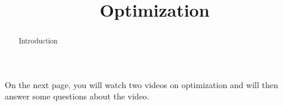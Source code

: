 \documentclass[handout]{ximera}
\title{Optimization}
\begin{document}
\begin{abstract} Introduction %
\end{abstract}

\maketitle

On the next page, you will watch two videos on optimization and will then answer some questions about the video.
\end{document}
